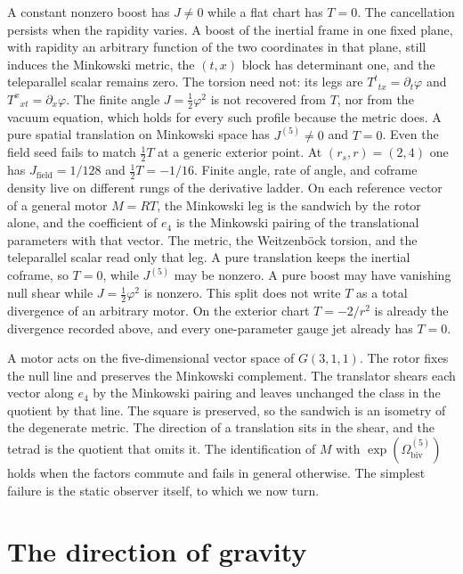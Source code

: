 \documentclass[a4paper]{article}
\begin{document}
A constant nonzero boost has \(J\neq 0\) while a flat chart has \(T=0\). The cancellation persists when the rapidity varies. A boost of the inertial frame in one fixed plane, with rapidity an arbitrary function of the two coordinates in that plane, still induces the Minkowski metric, the \((t,x)\) block has determinant one, and the teleparallel scalar remains zero. The torsion need not: its legs are \(T^{t}{}_{tx}=\partial_{t}\varphi\) and \(T^{x}{}_{xt}=\partial_{x}\varphi\). The finite angle \(J=\tfrac12\varphi^{2}\) is not recovered from \(T\), nor from the vacuum equation, which holds for every such profile because the metric does. A pure spatial translation on Minkowski space has \(J^{(5)}\neq 0\) and \(T=0\). Even the field seed fails to match \(\tfrac12 T\) at a generic exterior point. At \((r_{s},r)=(2,4)\) one has \(J_{\mathrm{field}}=1/128\) and \(\tfrac12 T=-1/16\). Finite angle, rate of angle, and coframe density live on different rungs of the derivative ladder. On each reference vector of a general motor \(M=RT\), the Minkowski leg is the sandwich by the rotor alone, and the coefficient of \(e_{4}\) is the Minkowski pairing of the translational parameters with that vector. The metric, the Weitzenb\"{o}ck torsion, and the teleparallel scalar read only that leg. A pure translation keeps the inertial coframe, so \(T=0\), while \(J^{(5)}\) may be nonzero. A pure boost may have vanishing null shear while \(J=\tfrac12\varphi^{2}\) is nonzero. This split does not write \(T\) as a total divergence of an arbitrary motor. On the exterior chart \(T=-2/r^{2}\) is already the divergence recorded above, and every one-parameter gauge jet already has \(T=0\).

A motor acts on the five-dimensional vector space of \(G(3,1,1)\). The rotor fixes the null line and preserves the Minkowski complement. The translator shears each vector along \(e_{4}\) by the Minkowski pairing and leaves unchanged the class in the quotient by that line. The square is preserved, so the sandwich is an isometry of the degenerate metric. The direction of a translation sits in the shear, and the tetrad is the quotient that omits it. The identification of \(M\) with \(\exp(\Omega_{\mathrm{biv}}^{(5)})\) holds when the factors commute and fails in general otherwise. The simplest failure is the static observer itself, to which we now turn.

\section{The direction of gravity}
\label{sec:direction}
\end{document}
